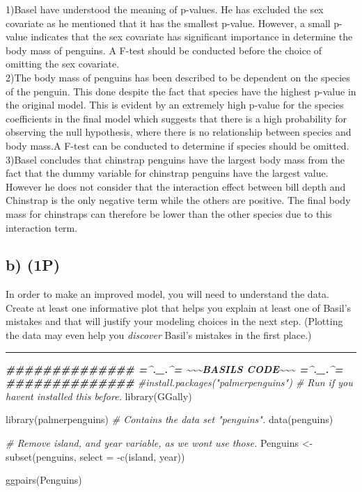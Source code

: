 \documentclass[
]{article}
\newenvironment{Shaded}{\begin{snugshade}}{\end{snugshade}}
\newcommand{\AttributeTok}[1]{\textcolor[rgb]{0.77,0.63,0.00}{#1}}
\newcommand{\CommentTok}[1]{\textcolor[rgb]{0.56,0.35,0.01}{\textit{#1}}}
\newcommand{\DocumentationTok}[1]{\textcolor[rgb]{0.56,0.35,0.01}{\textbf{\textit{#1}}}}
\newcommand{\FunctionTok}[1]{\textcolor[rgb]{0.00,0.00,0.00}{#1}}
\newcommand{\NormalTok}[1]{#1}
\newcommand{\OtherTok}[1]{\textcolor[rgb]{0.56,0.35,0.01}{#1}}
\newcommand{\SpecialCharTok}[1]{\textcolor[rgb]{0.00,0.00,0.00}{#1}}
\begin{document}
1)Basel have understood the meaning of p-values. He has excluded the sex
covariate as he mentioned that it has the smallest p-value. However, a
small p-value indicates that the sex covariate has significant
importance in determine the body mass of penguins. A F-test should be
conducted before the choice of omitting the sex covariate.\\
2)The body mass of penguins has been described to be dependent on the
species of the penguin. This done despite the fact that species have the
highest p-value in the original model. This is evident by an extremely
high p-value for the species coefficients in the final model which
suggests that there is a high probability for observing the null
hypothesis, where there is no relationship between species and body
mass.A F-test can be conducted to determine if species should be
omitted. 3)Basel concludes that chinstrap penguins have the largest body
mass from the fact that the dummy variable for chinstrap penguins have
the largest value. However he does not consider that the interaction
effect between bill depth and Chinstrap is the only negative term while
the others are positive. The final body mass for chinstraps can
therefore be lower than the other species due to this interaction term.

\hypertarget{b-1p-1}{%
\subsection{b) (1P)}\label{b-1p-1}}

In order to make an improved model, you will need to understand the
data. Create at least one informative plot that helps you explain at
least one of Basil's mistakes and that will justify your modeling
choices in the next step. (Plotting the data may even help you
\emph{discover} Basil's mistakes in the first place.)

\begin{center}\rule{0.5\linewidth}{0.5pt}\end{center}

\begin{Shaded}
\begin{Highlighting}[]
\DocumentationTok{\#\#\#\#\#\#\#\#\#\#\#\#\#\# =\^{}.\_.\^{}=  \textasciitilde{}\textasciitilde{}\textasciitilde{}BASIL\textquotesingle{}S CODE\textasciitilde{}\textasciitilde{}\textasciitilde{}  =\^{}.\_.\^{}= \#\#\#\#\#\#\#\#\#\#\#\#\#\# }
\CommentTok{\#install.packages("palmerpenguins")  \# Run if you haven\textquotesingle{}t installed this before.}
\FunctionTok{library}\NormalTok{(GGally)}

\FunctionTok{library}\NormalTok{(palmerpenguins) }\CommentTok{\# Contains the data set "penguins".}
\FunctionTok{data}\NormalTok{(penguins)}

\CommentTok{\# Remove island, and year variable, as we won\textquotesingle{}t use those.}
\NormalTok{Penguins }\OtherTok{\textless{}{-}} \FunctionTok{subset}\NormalTok{(penguins, }\AttributeTok{select =} \SpecialCharTok{{-}}\FunctionTok{c}\NormalTok{(island, year))}


\FunctionTok{ggpairs}\NormalTok{(Penguins)}
\end{Highlighting}
\end{Shaded}
\end{document}
